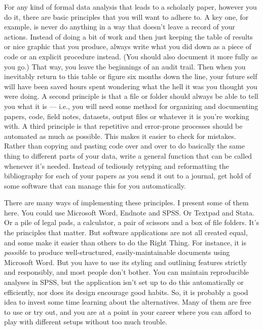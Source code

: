 \documentclass[11pt,article]{memoir}
\begin{document}
For any kind of formal data analysis that leads to a scholarly paper, however you do it, there are basic principles that you will want to adhere to. A key one, for example, is never do anything in a way that doesn't leave a record of your actions. Instead of doing a bit of work and then just keeping the table of results or nice graphic that you produce, always write what you did down as a piece of code or an explicit procedure instead. (You should also document it more fully as you go.) That way, you leave the beginnings of an audit trail. Then when you inevitably return to this table or figure six months down the line, your future self will have been saved hours spent wondering what the hell it was you thought you were doing. A second principle is that a file or folder should always be able to tell you what it is --- i.e., you will need some method for organizing and documenting papers, code, field notes, datasets, output files or whatever it is you're working with. A third principle is that repetitive and error-prone processes should be automated as much as possible. This makes it easier to check for mistakes. Rather than copying and pasting code over and over to do basically the same thing to different parts of your data, write a general function that can be called whenever it's needed. Instead of tediously retyping and reformatting the bibliography for each of your papers as you send it out to a journal, get hold of some software that can manage this for you automatically.

There are many ways of implementing these principles. I present some of them here. You could use Microsoft Word, Endnote and SPSS. Or Textpad and Stata. Or a pile of legal pads, a calculator, a pair of scissors and a box of file folders. It's the principles that matter. But software applications are not all created equal, and some make it easier than others to do the Right Thing. For instance, it is \emph{possible} to produce well-structured, easily-maintainable documents using Microsoft Word. But you have to use its styling and outlining features strictly and responsibly, and most people don't bother. You can maintain reproducible analyses in SPSS, but the application isn't set up to do this automatically or efficiently, nor does its design encourage good habits. So, it is probably a good idea to invest some time learning about the alternatives. Many of them are free to use or try out, and you are at a point in your career where you can afford to play with different setups without too much trouble.
\end{document}
